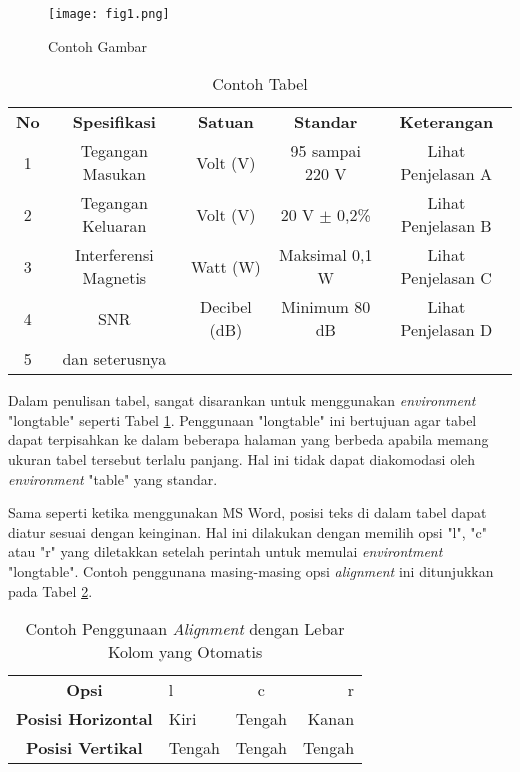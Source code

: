         \begin{figure}[!ht]
            \centering
            \texttt{[image: fig1.png]}
            \caption{Contoh Gambar}
            \label{fig:example1}
        \end{figure}
    
        \begin{longtable}{|c|c|c|c|c|}
            \caption{Contoh Tabel}
            \label{tab:example1}
            \vspace{-0.75em}\\
            \hline
            \textbf{No} & \textbf{Spesifikasi}  & \textbf{Satuan} & \textbf{Standar} & \textbf{Keterangan} \\ \hline
            1           & Tegangan Masukan      & Volt (V)        & 95 sampai 220 V  & Lihat Penjelasan A  \\ \hline
            2           & Tegangan Keluaran     & Volt (V)        & 20 V $\pm$ 0,2\% & Lihat Penjelasan B  \\ \hline
            3           & Interferensi Magnetis & Watt (W)        & Maksimal 0,1 W   & Lihat Penjelasan C  \\ \hline
            4           & SNR                   & Decibel (dB)    & Minimum 80 dB    & Lihat Penjelasan D  \\ \hline
            5           & dan seterusnya        &                 &                  &                     \\ \hline
        \end{longtable}
        
        Dalam penulisan tabel, sangat disarankan untuk menggunakan \textit{environment} "longtable" seperti Tabel \ref{tab:example1}. Penggunaan "longtable" ini bertujuan agar tabel dapat terpisahkan ke dalam beberapa halaman yang berbeda apabila memang ukuran tabel tersebut terlalu panjang. Hal ini tidak dapat diakomodasi oleh \textit{environment} "table" yang standar.
        
        Sama seperti ketika menggunakan MS Word, posisi teks di dalam tabel dapat diatur sesuai dengan keinginan. Hal ini dilakukan dengan memilih opsi "l", "c" atau "r" yang diletakkan setelah perintah untuk memulai \textit{environtment} "longtable". Contoh penggunana masing-masing opsi \textit{alignment} ini ditunjukkan pada Tabel \ref{tab:alignment_01}.
        
        \begin{longtable}{|c|l|c|r|}
            \caption{Contoh Penggunaan \textit{Alignment} dengan Lebar Kolom yang Otomatis}
            \label{tab:alignment_01}
            \vspace{-0.75em}\\
            \hline
                \textbf{Opsi} & l & c & r    \\
            \hline
                \textbf{Posisi Horizontal} & Kiri & Tengah & Kanan \\
            \hline
                \textbf{Posisi Vertikal} & Tengah & Tengah & Tengah \\
            \hline
        \end{longtable}
        
